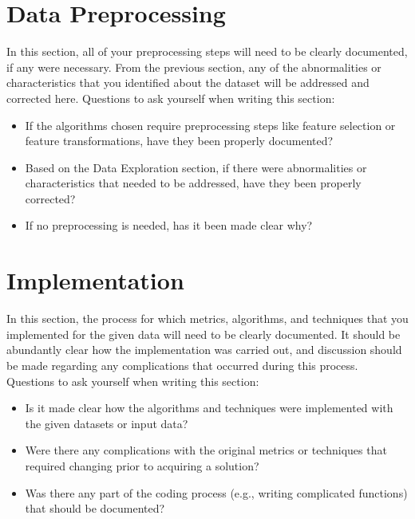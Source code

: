 \documentclass[twoside,openright,titlepage,numbers=noenddot,headinclude,%
               footinclude=true,cleardoublepage=empty,abstractoff,BCOR=5mm,%
               paper=a4,fontsize=11pt,ngerman,american]{scrreprt}
\numberwithin{theorem}{chapter}
\numberwithin{definition}{chapter}
\numberwithin{algorithm}{chapter}
\numberwithin{figure}{chapter}
\numberwithin{table}{chapter}
\numberwithin{equation}{chapter}
\begin{document}
\section*{Data Preprocessing}
In this section, all of your preprocessing steps will need to be clearly documented, if any were necessary. From the previous section, any of the abnormalities or characteristics that you identified about the dataset will be addressed and corrected here. Questions to ask yourself when writing this section:
\begin{itemize}%
\item If the algorithms chosen require preprocessing steps like feature selection or feature transformations, have they been properly documented?
\item Based on the Data Exploration section, if there were abnormalities or characteristics that needed to be addressed, have they been properly corrected?
\item If no preprocessing is needed, has it been made clear why?
\end{itemize}

\section*{Implementation}
In this section, the process for which metrics, algorithms, and techniques that you implemented for the given data will need to be clearly documented. It should be abundantly clear how the implementation was carried out, and discussion should be made regarding any complications that occurred during this process. Questions to ask yourself when writing this section:
\begin{itemize}%
\item Is it made clear how the algorithms and techniques were implemented with the given datasets or input data?
\item Were there any complications with the original metrics or techniques that required changing prior to acquiring a solution?
\item Was there any part of the coding process (e.g., writing complicated functions) that should be documented?
\end{itemize}
\end{document}
